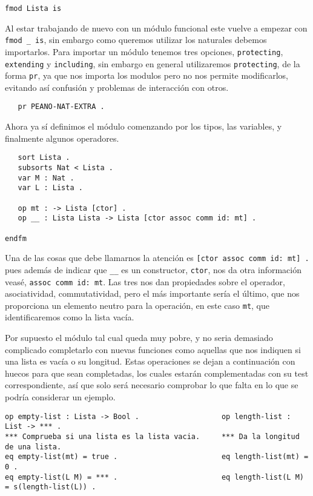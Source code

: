 {\codesize
\begin{verbatim}
fmod Lista is
\end{verbatim}
}
Al estar trabajando de nuevo con un módulo funcional este vuelve a empezar con \verb"fmod _ is", sin embargo como queremos utilizar los naturales debemos importarlos. Para importar un módulo tenemos tres opciones, \texttt{protecting}, \texttt{extending} y \texttt{including}, sin embargo en general utilizaremos \texttt{protecting}, de la forma \texttt{pr}, ya que nos importa los modulos pero no nos permite modificarlos, evitando así confusión y problemas de interacción con otros. \par

{\codesize
\begin{verbatim}
   pr PEANO-NAT-EXTRA .
\end{verbatim}
}

Ahora ya sí definimos el módulo comenzando por los tipos, las variables, y finalmente algunos operadores. \par

{\codesize
\begin{verbatim}
   sort Lista .
   subsorts Nat < Lista .
   var M : Nat .
   var L : Lista .	

   op mt : -> Lista [ctor] .
   op __ : Lista Lista -> Lista [ctor assoc comm id: mt] .

endfm
\end{verbatim}
}

Una de las cosas que debe llamarnos la atención es \verb"[ctor assoc comm id: mt] ." pues además de indicar que \verb"__" es un constructor, \texttt{ctor}, nos da otra información veasé, \texttt{assoc comm id: mt}. Las tres nos dan propiedades sobre el operador, asociatividad, commutatividad, pero el más importante sería el último, que nos proporciona un elemento neutro para la operación, en este caso \texttt{mt}, que identificaremos como la lista vacía. \par

Por supuesto el módulo tal cual queda muy pobre, y no seria demasiado complicado completarlo con nuevas funciones como aquellas que nos indiquen si una lista es vacía o su longitud. Estas operaciones se dejan a continuación con huecos para que sean completadas, los cuales estarán complementadas con su test correspondiente, así que solo será necesario comprobar lo que falta en lo que se podría considerar un ejemplo. \par

{\codesize
\begin{verbatim}
op empty-list : Lista -> Bool .                   op length-list : List -> *** .
*** Comprueba si una lista es la lista vacia.     *** Da la longitud de una lista.
eq empty-list(mt) = true .                        eq length-list(mt) = 0 .
eq empty-list(L M) = *** .                        eq length-list(L M) = s(length-list(L)) .
\end{verbatim}
}

